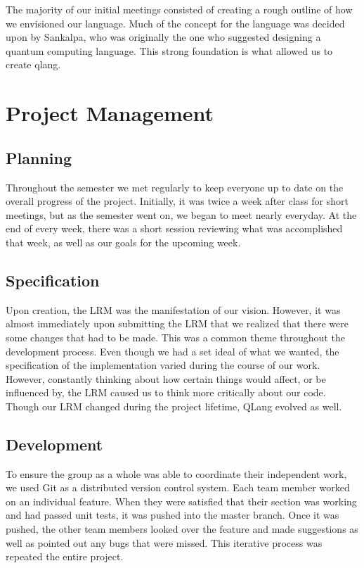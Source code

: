 
The majority of our initial meetings consisted of creating a rough outline of how we envisioned our language. Much of the concept for the language was decided upon by Sankalpa, who was originally the one who suggested designing a quantum computing language. This strong foundation is what allowed us to create qlang.
 
\section{Project Management}
\subsection{ Planning}
Throughout the semester we met regularly to keep everyone up to date on the overall progress of the project. Initially, it was twice a week after class for short meetings, but as the semester went on, we began to meet nearly everyday. At the end of every week, there was a short session reviewing what was accomplished that week, as well as our goals for the upcoming week.

\subsection{Specification}
Upon creation, the LRM was the manifestation of our vision. However, it was almost immediately upon submitting the LRM that we realized that there were some changes that had to be made. This was a common theme throughout the development process. Even though we had a set ideal of what we wanted, the specification of the implementation varied during the course of our work. However, constantly thinking about how certain things would affect, or be influenced by, the LRM caused us to think more critically about our code. Though our LRM changed during the project lifetime, QLang evolved as well.

\subsection{Development}
To ensure the group as a whole was able to coordinate their independent work, we used Git as a distributed version control system. Each team member worked on an individual feature. When they were satisfied that their section was working and had passed unit tests, it was pushed into the master branch. Once it was pushed, the other team members looked over the feature and made suggestions as well as pointed out any bugs that were missed. This iterative process was repeated the entire project. 

